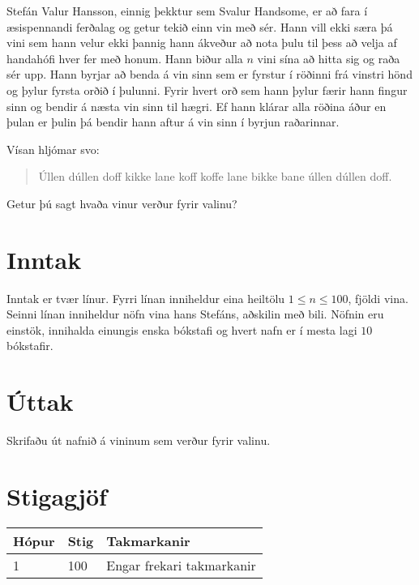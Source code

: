 Stefán Valur Hansson, einnig þekktur sem Svalur Handsome, er að fara í æsispennandi ferðalag og getur tekið einn vin með sér.
Hann vill ekki særa þá vini sem hann velur ekki þannig hann ákveður að nota þulu til þess að velja af handahófi hver fer með honum.
Hann biður alla $n$ vini sína að hitta sig og raða sér upp.
Hann byrjar að benda á vin sinn sem er fyrstur í röðinni frá vinstri hönd og þylur fyrsta orðið í þulunni.
Fyrir hvert orð sem hann þylur færir hann fingur sinn og bendir á næsta vin sinn til hægri.
Ef hann klárar alla röðina áður en þulan er þulin þá bendir hann aftur á vin sinn í byrjun raðarinnar.

Vísan hljómar svo:
\begin{verse}
    Úllen dúllen doff
    kikke lane koff
    koffe lane bikke bane
    úllen dúllen doff.
\end{verse}

Getur þú sagt hvaða vinur verður fyrir valinu?

\section*{Inntak}
Inntak er tvær línur.
Fyrri línan inniheldur eina heiltölu $1 \leq n \leq 100$, fjöldi vina.
Seinni línan inniheldur nöfn vina hans Stefáns, aðskilin með bili.
Nöfnin eru einstök, innihalda einungis enska bókstafi og hvert nafn er í mesta lagi $10$ bókstafir.

\section*{Úttak}
Skrifaðu út nafnið á vininum sem verður fyrir valinu.

\section*{Stigagjöf}
\begin{tabular}{|l|l|l|}
\hline
Hópur & Stig & Takmarkanir \\ \hline
1     & 100  & Engar frekari takmarkanir \\ \hline
\end{tabular}

